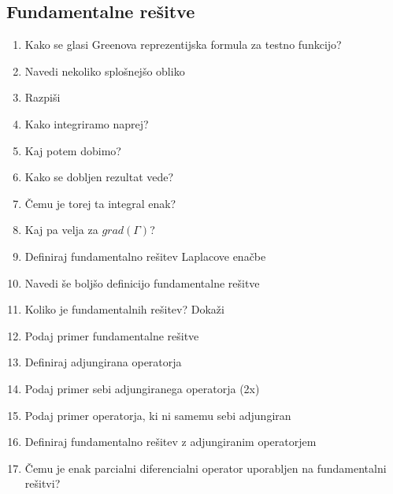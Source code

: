 \documentclass{article}
\begin{document}
    \subsection{Fundamentalne rešitve}
    \begin{enumerate}
        \item Kako se glasi Greenova reprezentijska formula za testno funkcijo?
        \item Navedi nekoliko splošnejšo obliko
        \item Razpiši
        \item Kako integriramo naprej?
        \item Kaj potem dobimo?
        \item Kako se dobljen rezultat vede?
        \item Čemu je torej ta integral enak?
        \item Kaj pa velja za $grad(\Gamma)$?
        \item Definiraj fundamentalno rešitev Laplacove enačbe
        \item Navedi še boljšo definicijo fundamentalne rešitve
        \item Koliko je fundamentalnih rešitev? Dokaži
        \item Podaj primer fundamentalne rešitve
        \item Definiraj adjungirana operatorja
        \item Podaj primer sebi adjungiranega operatorja (2x) 
        \item Podaj primer operatorja, ki ni samemu sebi adjungiran
        \item Definiraj fundamentalno rešitev z adjungiranim operatorjem
        \item Čemu je enak parcialni diferencialni operator uporabljen na fundamentalni rešitvi?
    \end{enumerate}
\end{document}
